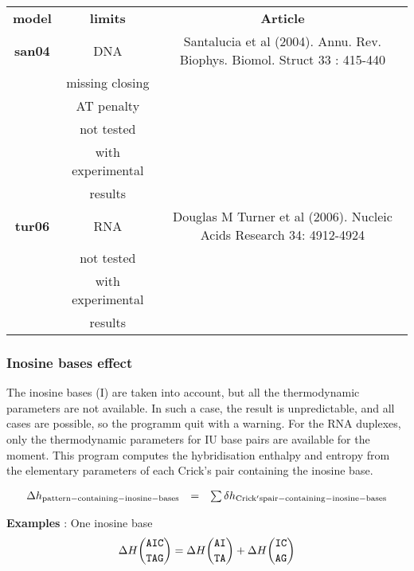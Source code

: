 \documentclass{article}
\begin{document}
\begin{table}[h]
\begin{tabular}[h]{| c | c | c |}
\textbf{model} & \textbf{limits} & \textbf{Article} \\
\textbf{san04} & DNA & Santalucia et al (2004). Annu. Rev. Biophys. Biomol. Struct 33 : 415-440\\
 & missing closing & \\
 & AT penalty & \\
 & not tested & \\
 & with experimental & \\
 & results & \\
\textbf{tur06} & RNA & Douglas M Turner et al (2006). Nucleic Acids Research 34: 4912-4924 \\
 & not tested & \\
 & with experimental & \\
 & results & \\
\end{tabular}
\end{table}

\subsubsection{Inosine bases effect}

The inosine bases (I) are taken into account, but all the thermodynamic parameters are not available. 
In such a case, the result is unpredictable, and all cases are possible, so the
programm quit with a warning. For the RNA duplexes, only the thermodynamic parameters
for IU base pairs are available for the moment.
This program computes the hybridisation enthalpy and entropy from the elementary 
parameters of each Crick's pair containing the inosine base.

\begin{displaymath}
  \begin{array}[t]{ccc}
  \Delta{}h_\mathrm{pattern-containing-inosine-bases}&=&\sum
  \delta{}h_\mathrm{Crick's pair-containing-inosine-bases}\\
  \end{array}
\end{displaymath}

\textbf{Examples} : One inosine base
\begin{multline*}
\Delta H {\mbox{\texttt{AIC}} \choose \mbox{\texttt{TAG}}} = 
\Delta H {\mbox{\texttt{AI}} \choose \mbox{\texttt{TA}}} +
\Delta H {\mbox{\texttt{IC}} \choose \mbox{\texttt{AG}}}\\
\end{multline*}
\end{document}
